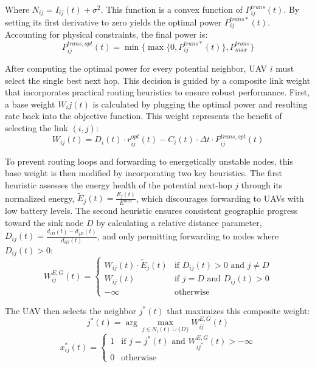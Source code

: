\documentclass[runningheads]{llncs}
\begin{document}
Where $N_{ij}=I_{ij}(t)+\sigma^{2}$. This function is a convex function of $P_{ij}^{trans}(t)$. By setting its first derivative to zero yields the optimal power $P_{ij}^{trans*}(t)$. Accounting for physical constraints, the final power is:
\begin{equation}
    P_{ij}^{trans,opt}(t)=\min\{\max\{0,P_{ij}^{trans*}(t)\},P_{max}^{trans}\}
\label{eq:pij}
\end{equation}

After computing the optimal power for every potential neighbor, UAV $i$ must select the single best next hop. This decision is guided by a composite link weight that incorporates practical routing heuristics to ensure robust performance. First, a base weight $W_ij(t)$ is calculated by plugging the optimal power and resulting rate back into the objective function. This weight represents the benefit of selecting the link $(i,j)$:
\begin{equation}
    W_{ij}(t)=D_{i}(t)\cdot r_{ij}^{opt}(t)-C_{i}(t)\cdot\Delta t\cdot P_{ij}^{trans,opt}(t)
\end{equation}

To prevent routing loops and forwarding to energetically unstable nodes, this base weight is then modified by incorporating two key heuristics. The first heuristic assesses the energy health of the potential next-hop $j$ through its normalized energy, $\tilde{E}_{j}(t)=\frac{E_{j}(t)}{E^{max}}$, which discourages forwarding to UAVs with low battery levels. The second heuristic ensures consistent geographic progress toward the sink node $D$ by calculating a relative distance parameter, $D_{ij}(t)=\frac{d_{iD}(t)-d_{jD}(t)}{d_{iD}(t)}$, and only permitting forwarding to nodes where $D_{ij}(t)>0$:
\begin{equation}
    W_{ij}^{E,G}(t)=\begin{cases}W_{ij}(t)\cdot\tilde{E}_{j}(t)& \text{if } D_{ij}(t)>0 \text{ and } j\ne D \\ W_{ij}(t)& \text{if } j=D \text{ and } D_{ij}(t)>0  \\ -\infty& \text{otherwise}\end{cases}
\label{eq:wij}
\end{equation}

The UAV then selects the neighbor $j^{*}(t)$ that maximizes this composite weight:
\begin{equation}
    j^{*}(t)=\arg\max_{j\in N_{i}(t)\cup\{D\}}W_{ij}^{E,G}(t)
\end{equation}
\begin{equation}
    x^{*}_{ij}(t)=\begin{cases}1& \text{if } j=j^{*}(t) \text{ and } W_{ij^{*}}^{E,G}(t)>-\infty \\ 0& \text{otherwise}\end{cases}
\end{equation}
\end{document}
